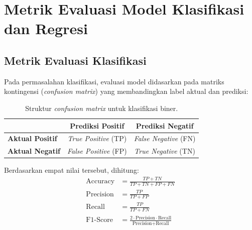 \documentclass[a4paper,oneside,12pt]{report}
\begin{document}
\section{Metrik Evaluasi Model Klasifikasi dan Regresi}
\subsection{Metrik Evaluasi Klasifikasi}
Pada permasalahan klasifikasi, evaluasi model didasarkan pada matriks kontingensi (\textit{confusion matrix}) yang membandingkan label aktual dan prediksi:
\begin{table}[H]
	\centering
	\caption{Struktur \textit{confusion matrix} untuk klasifikasi biner.}
	\label{tab:cm-teori}
	\begin{tabular}{|l|c|c|}
		\hline
		                        & \textbf{Prediksi Positif}    & \textbf{Prediksi Negatif}    \\
		\hline
		\textbf{Aktual Positif} & \textit{True Positive} (TP)  & \textit{False Negative} (FN) \\
		\hline
		\textbf{Aktual Negatif} & \textit{False Positive} (FP) & \textit{True Negative} (TN)  \\
		\hline
	\end{tabular}
\end{table}

Berdasarkan empat nilai tersebut, dihitung:
\begin{align}
	\text{Accuracy}  & = \frac{TP + TN}{TP + TN + FP + FN}                                                     \\
	\text{Precision} & = \frac{TP}{TP + FP}                                                                    \\
	\text{Recall}    & = \frac{TP}{TP + FN}                                                                    \\
	\text{F1-Score}  & = \frac{2 \cdot \text{Precision} \cdot \text{Recall}}{\text{Precision} + \text{Recall}}
\end{align}
\end{document}
